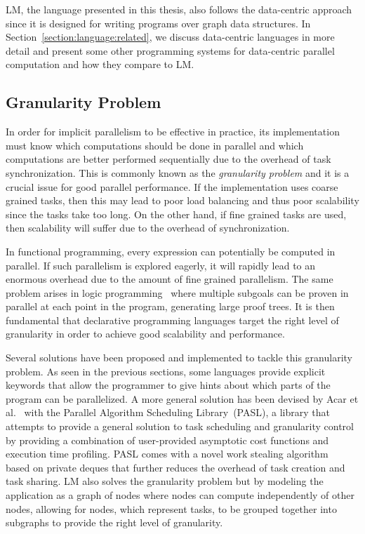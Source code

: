 LM, the language presented in this thesis, also follows the data-centric
approach since it is designed for writing programs over graph data structures.
In Section~\ref{section:language:related}, we discuss data-centric languages in
more detail and present some other programming systems for data-centric parallel
computation and how they compare to LM.

\subsection{Granularity Problem}

In order for implicit parallelism to be effective in practice, its
implementation must know which computations should be done in parallel and which
computations are better performed sequentially due to the overhead of task
synchronization. This is commonly known as the \emph{granularity problem} and it
is a crucial issue for good parallel performance. If the implementation uses
coarse grained tasks, then this may lead to poor load balancing and thus poor
scalability since the tasks take too long. On the other hand, if fine grained
tasks are used, then scalability will suffer due to the overhead of
synchronization.

In functional programming, every expression can potentially be computed in
parallel. If such parallelism is explored eagerly, it will rapidly lead to
an enormous overhead due to the amount of fine grained parallelism.  The same
problem arises in logic programming~\cite{logprog_granularity} where multiple
subgoals can be proven in parallel at each point in the program, generating
large proof trees. It is then fundamental that declarative programming languages
target the right level of granularity in order to achieve good scalability and
performance.

Several solutions have been proposed and implemented to tackle this granularity
problem. As seen in the previous sections, some languages provide explicit
keywords that allow the programmer to give hints about which parts of the
program can be parallelized. A more general solution has been devised by Acar et
al.~\cite{Acar:2011} with the Parallel Algorithm Scheduling Library~(PASL), a
library that attempts to provide a general solution to task scheduling and
granularity control by providing a combination of user-provided asymptotic cost
functions and execution time profiling. PASL comes with a novel work stealing
algorithm~\cite{acar-chargueraud-rainey-13-sched} based on private deques that
further reduces the overhead of task creation and task sharing. LM also solves
the granularity problem but by modeling the application as a graph of nodes
where nodes can compute independently of other nodes, allowing for nodes, which
represent tasks, to be grouped together into subgraphs to provide the right
level of granularity.

